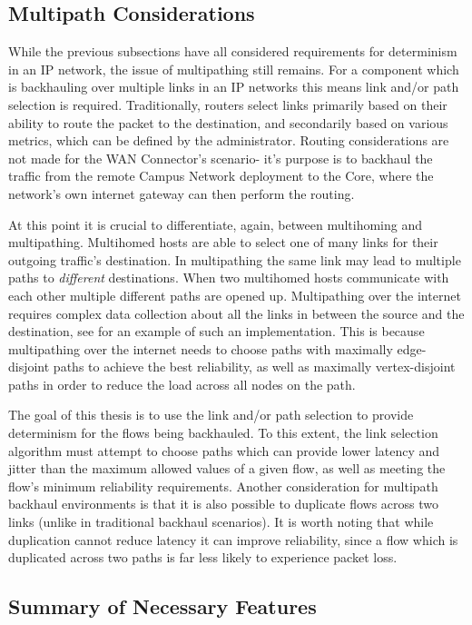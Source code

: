 \subsection{Multipath Considerations}

While the previous subsections have all considered requirements for determinism in an IP network, the issue of multipathing still remains. For a component which is backhauling over multiple links in an IP networks this means link and/or path selection is required. Traditionally, routers select links primarily based on their ability to route the packet to the destination, and secondarily based on various metrics, which can be defined by the administrator. Routing considerations are not made for the WAN Connector's scenario- it's purpose is to backhaul the traffic from the remote Campus Network deployment to the Core, where the network's own internet gateway can then perform the routing.

At this point it is crucial to differentiate, again, between multihoming and multipathing. Multihomed hosts are able to select one of many links for their outgoing traffic's destination. In multipathing the same link may lead to multiple paths to \textit{different} destinations. When two multihomed hosts communicate with each other multiple different paths are opened up. Multipathing over the internet requires complex data collection about all the links in between the source and the destination, see \cite{ganichev2010yamr} for an example of such an implementation. This is because multipathing over the internet needs to choose paths with maximally edge-disjoint paths to achieve the best reliability, as well as maximally vertex-disjoint paths in order to reduce the load across all nodes on the path.

The goal of this thesis is to use the link and/or path selection to provide determinism for the flows being backhauled. To this extent, the link selection algorithm must attempt to choose paths which can provide lower latency and jitter than the maximum allowed values of a given flow, as well as meeting the flow's minimum reliability requirements. Another consideration for multipath backhaul environments is that it is also possible to duplicate flows across two links (unlike in traditional backhaul scenarios). It is worth noting that while duplication cannot reduce latency it can improve reliability, since a flow which is duplicated across two paths is far less likely to experience packet loss.

\subsection{Summary of Necessary Features}


